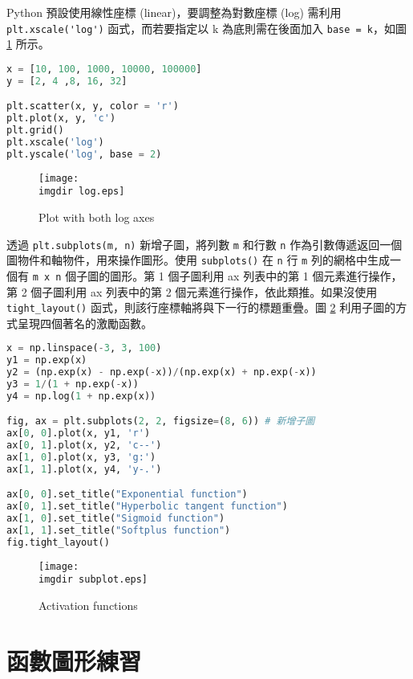 Python 預設使用線性座標 (linear)，要調整為對數座標 (log) 需利用 \verb|plt.xscale('log')| 函式，而若要指定以 k 為底則需在後面加入 \verb|base = k|，如圖 \ref{fig:log} 所示。
\bigskip
\begin{lstlisting}[language = Python]
x = [10, 100, 1000, 10000, 100000]
y = [2, 4 ,8, 16, 32]

plt.scatter(x, y, color = 'r')
plt.plot(x, y, 'c')
plt.grid()
plt.xscale('log')
plt.yscale('log', base = 2)
\end{lstlisting}
\begin{figure}[H]
    \centering
        \texttt{[image: \\imgdir log.eps]}
    \caption{Plot with both log axes}
    \label{fig:log}
\end{figure}

透過 \verb|plt.subplots(m, n)| 新增子圖，將列數 \verb|m| 和行數 \verb|n| 作為引數傳遞返回一個圖物件和軸物件，用來操作圖形。使用 \verb|subplots()| 在 \verb|n| 行 \verb|m| 列的網格中生成一個有 \verb|m x n| 個子圖的圖形。第 1 個子圖利用 ax 列表中的第 1 個元素進行操作，第 2 個子圖利用 ax 列表中的第 2 個元素進行操作，依此類推。如果沒使用 \verb|tight_layout()| 函式，則該行座標軸將與下一行的標題重疊。圖 \ref{fig:subplot} 利用子圖的方式呈現四個著名的激勵函數。
\bigskip
\begin{lstlisting}[language = Python]
x = np.linspace(-3, 3, 100)
y1 = np.exp(x)
y2 = (np.exp(x) - np.exp(-x))/(np.exp(x) + np.exp(-x))
y3 = 1/(1 + np.exp(-x))
y4 = np.log(1 + np.exp(x))

fig, ax = plt.subplots(2, 2, figsize=(8, 6)) # 新增子圖
ax[0, 0].plot(x, y1, 'r')
ax[0, 1].plot(x, y2, 'c--')
ax[1, 0].plot(x, y3, 'g:')
ax[1, 1].plot(x, y4, 'y-.')

ax[0, 0].set_title("Exponential function")
ax[0, 1].set_title("Hyperbolic tangent function")
ax[1, 0].set_title("Sigmoid function")
ax[1, 1].set_title("Softplus function")
fig.tight_layout()
\end{lstlisting}
\begin{figure}[H]
    \centering
        \texttt{[image: \\imgdir subplot.eps]}
    \caption{Activation functions}
    \label{fig:subplot}
\end{figure}

\section{函數圖形練習}

